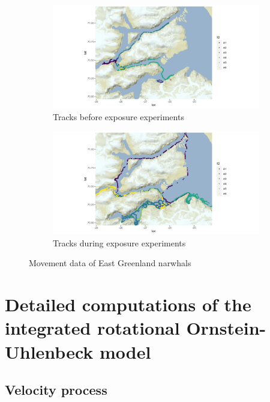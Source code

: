 \documentclass[11pt]{article}
\newcommand {\1}{\mathbb{1}}
\begin{document}
\begin{figure}[H]
	\centering
	\begin{subfigure}{0.49\textwidth}
		\centering
		\includegraphics[scale=0.38]{images/data_exploration/all_tracksBE.png}
		\caption{Tracks before exposure experiments}
	\end{subfigure}
	\begin{subfigure}{0.49\textwidth}
		\centering
		\includegraphics[scale=0.38]{images/data_exploration/all_tracksAE.png}
		\caption{Tracks during exposure experiments}
	\end{subfigure}
	\caption{Movement data of East Greenland narwhals}
	\label{fig: tracks before and after exposure}
\end{figure}


\section{Detailed computations of the integrated rotational Ornstein-Uhlenbeck model}
\label{section: detailed RACVM computations}

\subsection{Velocity process}
\end{document}
